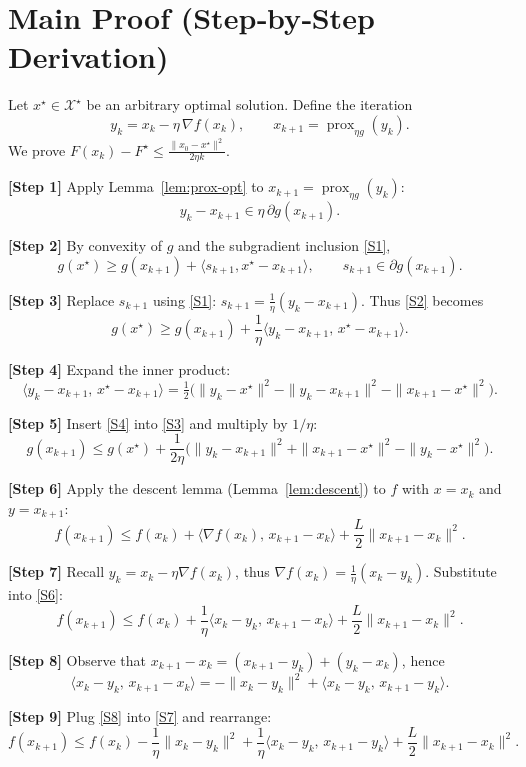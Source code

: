 \documentclass{article}
\newcommand{\prox}{\operatorname{prox}}
\newcommand{\grad}{\nabla}
\begin{document}
\section*{Main Proof (Step‑by‑Step Derivation)}
Let $x^{\star}\in\mathcal{X}^{\star}$ be an arbitrary optimal solution. Define the iteration
\[
y_{k}=x_{k}-\eta\,\grad f(x_{k}),\qquad x_{k+1}= \prox_{\eta g}(y_{k}).
\]
We prove $F(x_{k})-F^{\star}\le \frac{\|x_{0}-x^{\star}\|^{2}}{2\eta k}$.

\bigskip
\noindent\textbf{[Step 1]} Apply Lemma~\ref{lem:prox-opt} to $x_{k+1}=\prox_{\eta g}(y_k)$:
\[
y_{k}-x_{k+1}\in\eta\,\partial g(x_{k+1}).
\tag{S1}
\]

\noindent\textbf{[Step 2]} By convexity of $g$ and the subgradient inclusion \eqref{S1},
\[
g(x^{\star})\ge g(x_{k+1})+\langle s_{k+1},x^{\star}-x_{k+1}\rangle,
\qquad s_{k+1}\in\partial g(x_{k+1}).
\tag{S2}
\]

\noindent\textbf{[Step 3]} Replace $s_{k+1}$ using \eqref{S1}: $s_{k+1}= \frac{1}{\eta}(y_{k}-x_{k+1})$.
Thus \eqref{S2} becomes
\[
g(x^{\star})\ge g(x_{k+1})+\frac{1}{\eta}\langle y_{k}-x_{k+1},\,x^{\star}-x_{k+1}\rangle.
\tag{S3}
\]

\noindent\textbf{[Step 4]} Expand the inner product:
\[
\langle y_{k}-x_{k+1},\,x^{\star}-x_{k+1}\rangle
= \tfrac12\Big(\|y_{k}-x^{\star}\|^{2}-\|y_{k}-x_{k+1}\|^{2}-\|x_{k+1}-x^{\star}\|^{2}\Big).
\tag{S4}
\]

\noindent\textbf{[Step 5]} Insert \eqref{S4} into \eqref{S3} and multiply by $1/\eta$:
\[
g(x_{k+1})\le g(x^{\star})+\frac{1}{2\eta}\Big(\|y_{k}-x_{k+1}\|^{2}+\|x_{k+1}-x^{\star}\|^{2}-\|y_{k}-x^{\star}\|^{2}\Big).
\tag{S5}
\]

\noindent\textbf{[Step 6]} Apply the descent lemma (Lemma~\ref{lem:descent}) to $f$ with $x=x_{k}$ and $y=x_{k+1}$:
\[
f(x_{k+1})\le f(x_{k})+\langle\grad f(x_{k}),\,x_{k+1}-x_{k}\rangle+\frac{L}{2}\|x_{k+1}-x_{k}\|^{2}.
\tag{S6}
\]

\noindent\textbf{[Step 7]} Recall $y_{k}=x_{k}-\eta\grad f(x_{k})$, thus $\grad f(x_{k})=\frac{1}{\eta}(x_{k}-y_{k})$. Substitute into \eqref{S6}:
\[
f(x_{k+1})\le f(x_{k})+\frac{1}{\eta}\langle x_{k}-y_{k},\,x_{k+1}-x_{k}\rangle+\frac{L}{2}\|x_{k+1}-x_{k}\|^{2}.
\tag{S7}
\]

\noindent\textbf{[Step 8]} Observe that $x_{k+1}-x_{k}= (x_{k+1}-y_{k})+(y_{k}-x_{k})$, hence
\[
\langle x_{k}-y_{k},\,x_{k+1}-x_{k}\rangle
= -\|x_{k}-y_{k}\|^{2}+\langle x_{k}-y_{k},\,x_{k+1}-y_{k}\rangle .
\tag{S8}
\]

\noindent\textbf{[Step 9]} Plug \eqref{S8} into \eqref{S7} and rearrange:
\[
f(x_{k+1})\le f(x_{k})-\frac{1}{\eta}\|x_{k}-y_{k}\|^{2}
+\frac{1}{\eta}\langle x_{k}-y_{k},\,x_{k+1}-y_{k}\rangle
+\frac{L}{2}\|x_{k+1}-x_{k}\|^{2}.
\tag{S9}
\]
\end{document}
